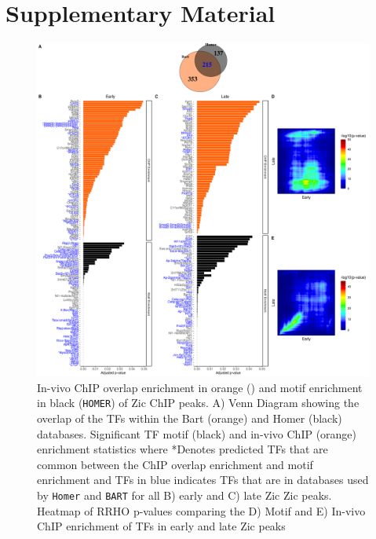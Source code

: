 \documentclass[fleqn,10pt]{wlscirep}
\begin{document}
\section*{Supplementary Material}
\begin{figure}[ht]
\centering
\includegraphics[width=.95\textwidth]{../figures/supp_figure2.png}
\caption{In-vivo ChIP overlap enrichment in orange () and motif enrichment in black (\texttt{HOMER}) of Zic ChIP peaks. A) Venn Diagram showing the overlap of the TFs within the Bart (orange) and Homer (black) databases. Significant TF motif (black) and in-vivo ChIP (orange) enrichment statistics where *Denotes predicted TFs that are common between the ChIP overlap enrichment and motif enrichment and TFs in blue indicates TFs that are in databases used by \texttt{Homer} and \texttt{BART} for all B) early and C) late Zic Zic peaks. Heatmap of RRHO p-values comparing the D) Motif and E) In-vivo ChIP enrichment of TFs in early and late Zic peaks}
\label{fig:HomerBart}
\end{figure}

\end{document}
